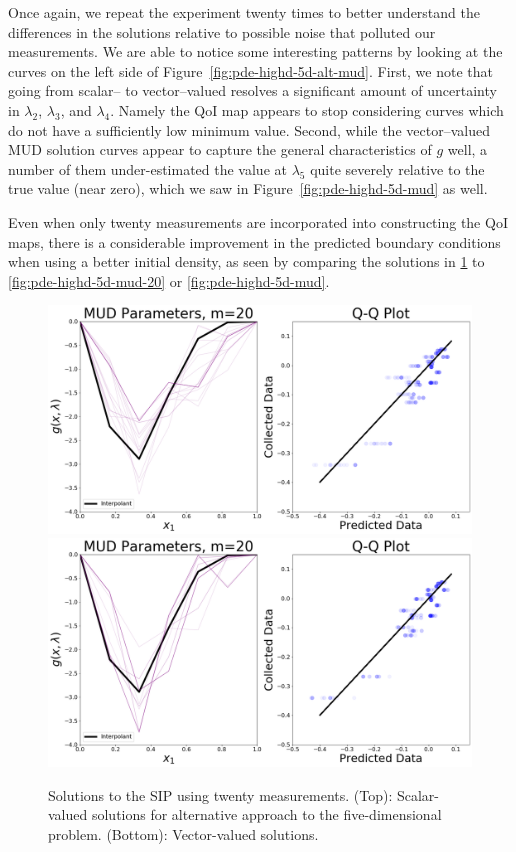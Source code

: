 Once again, we repeat the experiment twenty times to better understand the differences in the solutions relative to possible noise that polluted our measurements.
We are able to notice some interesting patterns by looking at the curves on the left side of Figure~\ref{fig:pde-highd-5d-alt-mud}.
First, we note that going from scalar-- to vector--valued resolves a significant amount of uncertainty in $\lambda_2$, $\lambda_3$, and $\lambda_4$.
Namely the QoI map appears to stop considering curves which do not have a sufficiently low minimum value.
Second, while the vector--valued MUD solution curves appear to capture the general characteristics of $g$ well, a number of them under-estimated the value at $\lambda_5$ quite severely relative to the true value (near zero), which we saw in Figure~\ref{fig:pde-highd-5d-mud} as well.

Even when only twenty measurements are incorporated into constructing the QoI maps, there is a considerable improvement in the predicted boundary conditions when using a better initial density, as seen by comparing the solutions in \ref{fig:pde-highd-5d-alt-mud-20} to \ref{fig:pde-highd-5d-mud-20} or \ref{fig:pde-highd-5d-mud}.

\begin{figure}[htbp]
\centering
  \includegraphics[width=0.95\linewidth]{figures/pde-highd/pde-highd_pair_D-alt-5-1_m20.png}
  \includegraphics[width=0.95\linewidth]{figures/pde-highd/pde-highd_pair_D-alt-5-5_m20.png}
\caption{Solutions to the SIP using twenty measurements.
(Top): Scalar-valued solutions for alternative approach to the five-dimensional problem.
(Bottom): Vector-valued solutions.
}
\label{fig:pde-highd-5d-alt-mud-20}
\end{figure}

